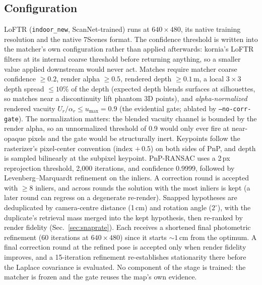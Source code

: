 \documentclass[journal]{IEEEtran}
\begin{document}
\subsection{Configuration}
LoFTR (\texttt{indoor\_new}, ScanNet-trained) runs at $640{\times}480$, its
native training resolution and the native 7Scenes format. The confidence
threshold is written into the matcher's own configuration rather than
applied afterwards: kornia's LoFTR filters at its internal coarse threshold
before returning anything, so a smaller value applied downstream would never
act. Matches require
matcher coarse confidence $\ge 0.2$, render alpha $\ge 0.5$, rendered depth $\ge 0.1$\,m,
a local $3{\times}3$ depth spread $\le 10\%$ of the depth (expected depth
blends surfaces at silhouettes, so matches near a discontinuity lift
phantom 3D points), and \emph{alpha-normalized} rendered vacuity
$U_r/\alpha_r \le u_{\max}{=}0.9$ (the evidential gate; ablated by
\texttt{--no-corr-gate}). The normalization matters: the blended vacuity
channel is bounded by the render alpha, so an unnormalized threshold of
0.9 would only ever fire at near-opaque pixels and the gate would be
structurally inert. Keypoints follow the rasterizer's pixel-center
convention (index $+\,0.5$) on both sides of PnP, and depth is sampled
bilinearly at the subpixel keypoint. PnP-RANSAC uses a 2\,px reprojection
threshold, 2{,}000 iterations, and confidence 0.9999, followed by
Levenberg--Marquardt refinement on the inliers. A correction round is
accepted with $\ge 8$ inliers, and across rounds the solution with the
most inliers is kept (a later round can regress on a degenerate re-render).
Snapped hypotheses are deduplicated by camera-centre distance (1\,cm) and
rotation angle ($2^\circ$), with the duplicate's retrieval mass merged into
the kept hypothesis, then re-ranked by render fidelity
(Sec.~\ref{sec:snaprate}). Each receives a
shortened final photometric refinement (60 iterations at $640{\times}480$)
since it starts ${\sim}1$\,cm from the optimum. A final correction round at
the refined pose is accepted only when render fidelity improves, and a
15-iteration refinement re-establishes stationarity there before the
Laplace covariance is evaluated. No component of the stage is trained: the
matcher is frozen and the gate reuses the map's own evidence.

\end{document}
